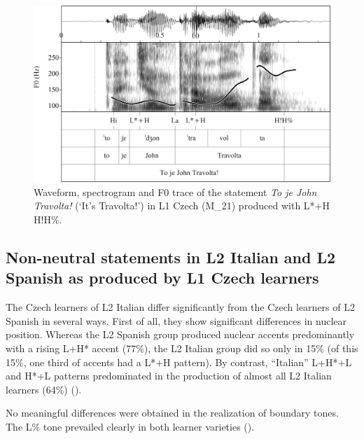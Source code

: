 \begin{figure}
\includegraphics[width=\textwidth]{figures/Figure_4.45.png}
\caption{Waveform, spectrogram and F0 trace of the statement \textit{To je John Travolta!} (‘It’s Travolta!’) in L1 Czech (M\_21) produced with L*+H H!H\%.}
\label{fig:4.45}
\end{figure}

\subsection{Non-neutral statements in L2 Italian and L2 Spanish as produced by L1 Czech learners}\label{sec:4.2.3}\largerpage

The Czech learners of L2 Italian differ significantly from the Czech learners of L2 Spanish in several ways. First of all, they show significant differences in nuclear position. Whereas the L2 Spanish group produced nuclear accents predominantly with a rising L+H* accent (77\%), the L2 Italian group did so only in 15\% (of this 15\%, one third of accents had a L*+H pattern). By contrast, “Italian” L+H*+L and H*+L patterns predominated in the production of almost all L2 Italian learners (64\%) ().

No meaningful differences were obtained in the realization of boundary tones. The L\% tone prevailed clearly in both learner varieties ().\pagebreak

